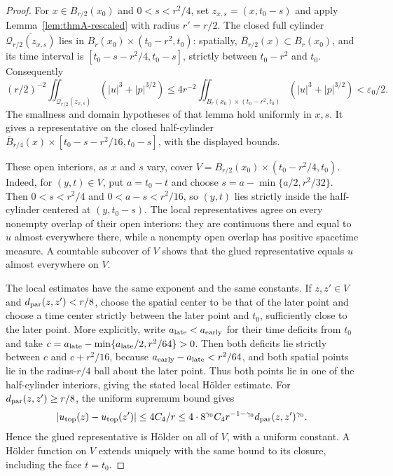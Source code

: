 \documentclass[11pt,letterpaper]{article}
\numberwithin{equation}{section}
\theoremstyle{plain}
\theoremstyle{definition}
\theoremstyle{remark}
\begin{document}
\begin{proof}
For $x\in B_{r/2}(x_0)$ and $0<s<r^2/4$, set
$z_{x,s}=(x,t_0-s)$ and apply Lemma~\ref{lem:thmA-rescaled} with radius
$r'=r/2$.  The closed full cylinder
$\overline{\mathcal Q_{r/2}(z_{x,s})}$ lies in
$B_r(x_0)\times(t_0-r^2,t_0)$: spatially,
$\overline B_{r/2}(x)\subset B_r(x_0)$, and its time interval is
$[t_0-s-r^2/4,t_0-s]$, strictly between $t_0-r^2$ and $t_0$.
Consequently
\[
 (r/2)^{-2}\iint_{\mathcal Q_{r/2}(z_{x,s})}
       (|u|^3+|p|^{3/2})
 \le 4r^{-2}\iint_{B_r(x_0)\times(t_0-r^2,t_0)}
       (|u|^3+|p|^{3/2})<\varepsilon_0/2.
\]
The smallness and domain hypotheses of that lemma hold uniformly in $x,s$.
It gives a representative on the closed half-cylinder
$\overline B_{r/4}(x)\times[t_0-s-r^2/16,t_0-s]$, with the displayed
bounds.

These open interiors, as $x$ and $s$ vary, cover
$V=B_{r/2}(x_0)\times(t_0-r^2/4,t_0)$.  Indeed, for $(y,t)\in V$, put
$a=t_0-t$ and choose
$s=a-\min\{a/2,r^2/32\}$.  Then $0<s<r^2/4$ and
$0<a-s<r^2/16$, so $(y,t)$ lies strictly inside the half-cylinder centered
at $(y,t_0-s)$.  The local representatives agree on every nonempty
overlap of their open interiors: they are continuous there and equal to
$u$ almost everywhere there, while a nonempty open overlap has positive
spacetime measure.  A countable subcover of $V$ shows that the glued
representative equals $u$ almost everywhere on $V$.

The local estimates have the same exponent and the same constants.  If
$z,z'\in V$ and $d_{\rm par}(z,z')<r/8$, choose the spatial center to be
that of the later point and choose a time center strictly between the later
point and $t_0$, sufficiently close to the later point.  More explicitly,
write $a_{\rm late}<a_{\rm early}$ for their time deficits from $t_0$ and
take
$c=a_{\rm late}-\min\{a_{\rm late}/2,r^2/64\}>0$.
Then both deficits lie strictly between $c$ and $c+r^2/16$, because
$a_{\rm early}-a_{\rm late}<r^2/64$, and both spatial points lie in the
radius-$r/4$ ball about the later point.  Thus both points lie in one of
the half-cylinder interiors, giving the stated local Hölder estimate.
For $d_{\rm par}(z,z')\ge r/8$, the uniform supremum bound gives
\[
 |u_{\rm top}(z)-u_{\rm top}(z')|
 \le 4C_4/r
 \le 4\cdot 8^{\gamma_0}C_4r^{-1-\gamma_0}
       d_{\rm par}(z,z')^{\gamma_0}.
\]
Hence the glued representative is Hölder on all of $V$, with a uniform
constant.  A Hölder function on $V$ extends uniquely with the same bound
to its closure, including the face $t=t_0$.
\end{proof}
\end{document}
